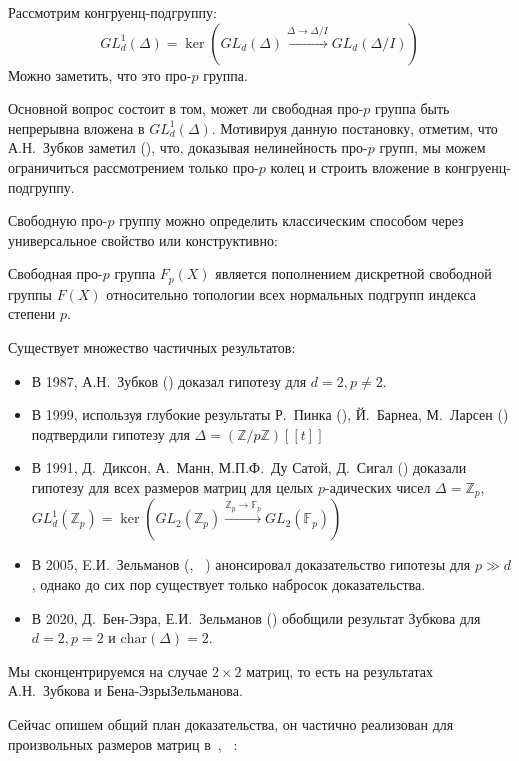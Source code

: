 Рассмотрим конгруенц-подгруппу:
\[
    GL_d^1(\Delta) = \ker\left( GL_d(\Delta) \xrightarrow{\Delta\to\Delta/I} GL_d(\Delta/I) \right)
\]
Можно заметить, что это про-$p$ группа.


Основной вопрос состоит в том, может ли свободная про-$p$ группа быть непрерывна вложена в $GL_d^1(\Delta)$.
Мотивируя данную постановку, отметим, что А.Н.\ Зубков заметил (\cite{Zubkov}), что, доказывая нелинейность про-$p$ групп, мы можем ограничиться рассмотрением только про-$p$ колец и строить вложение в конгруенц-подгруппу.

Свободную про-$p$ группу можно определить классическим способом через универсальное свойство или конструктивно:

\vskip 0.1in\noindent
\begin{definition}
    Свободная про-$p$ группа $F_p(X)$ является пополнением дискретной свободной группы $F(X)$ относительно топологии всех нормальных подгрупп индекса степени $p$.
\end{definition}
\vskip 0.1in\noindent

Существует множество частичных результатов:
\begin{itemize}
    \item В 1987, А.Н.\ Зубков (\cite{Zubkov}) доказал гипотезу для $d=2, p\neq2$.
    \item В 1999, используя глубокие результаты Р.\ Пинка (\cite{Pink}), Й.\ Барнеа, М.\ Ларсен (\cite{Barnea-Larsen}) подтвердили гипотезу для $\Delta=\left( \mathbb{Z}/p\mathbb{Z} \right)[[t]]$
    \item В 1991, Д.\ Диксон, А.\ Манн, М.П.Ф.\ Ду Сатой, Д.\ Сигал (\cite{DMSD}) доказали гипотезу для всех размеров матриц для целых $p$-адических чисел $\Delta=\mathbb{Z}_p$, $GL_d^1(\mathbb{Z}_p)=\ker\left( GL_2(\mathbb{Z}_p) \xrightarrow{\mathbb{Z}_p\to\mathbb{F}_p} GL_2(\mathbb{F}_p) \right)$
    \item В 2005, E.И.\ Зельманов (\cite{Zelmanov1}, ~\cite{Zelmanov2}) анонсировал доказательство гипотезы для $p\gg d$, однако до сих пор существует только набросок доказательства.
    \item В 2020, Д.\ Бен-Эзра, Е.И.\ Зельманов (\cite{Ben-Ezra-Zelmanov}) обобщили результат Зубкова для $d=2, p=2$ и $\mathrm{char}(\Delta)=2$.
\end{itemize}

Мы сконцентрируемся на случае $2\times 2$ матриц, то есть на результатах А.Н.\ Зубкова и Бена-Эзры\textemdash Зельманова.

Сейчас опишем общий план доказательства, он частично реализован для произвольных размеров матриц в\ \cite{Zelmanov1}, ~\cite{Zelmanov2}:

